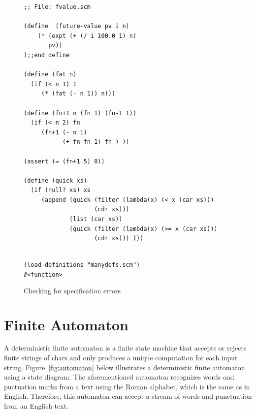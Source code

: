 \documentclass[a4paper,12pt]{book}
\newenvironment{fmpage}[1]
               {\begin{lrbox}{\fmbox}\begin{minipage}{#1}}
               {\end{minipage}\end{lrbox}\fbox{\usebox{\fmbox}}}
\begin{document}
\begin{figure}[!h]
\begin{fmpage}{0.9\textwidth}
\begin{verbatim}
;; File: fvalue.scm

(define  (future-value pv i n)
    (* (expt (+ (/ i 100.0 1) n) 
       pv))
);;end define

(define (fat n)
  (if (< n 1) 1
     (* (fat (- n 1)) n)))

(define (fn+1 n (fn 1) (fn-1 1))
  (if (< n 2) fn
     (fn+1 (- n 1)
           (+ fn fn-1) fn ) ))

(assert (= (fn+1 5) 8))

(define (quick xs)
  (if (null? xs) xs
     (append (quick (filter (lambda(x) (< x (car xs))) 
                    (cdr xs)))
             (list (car xs))
             (quick (filter (lambda(x) (>= x (car xs)))
                    (cdr xs))) )))


\end{verbatim}
\end{fmpage}

\begin{fmpage}{0.9\textwidth}
  \verb|(load-definitions "manydefs.scm")|\\
  \verb|#<function>|
\end{fmpage}
\caption{Checking for specification errors}
\label{debug-ready-source}
\end{figure}



\chapter{Finite Automaton}
A deterministic finite automaton
is a finite state machine that accepts or rejects
finite strings of chars and only produces
a unique computation  for each input string.
Figure~\ref{fig:automaton} below illustrates a deterministic
finite automaton using a state diagram.
The aforementioned automaton recognizes words
and puctuation marks from a text using
the Roman alphabet, which is the same
as in English. Therefore,
this automaton can  accept a
stream of words and punctuation from an English text.
\end{document}
